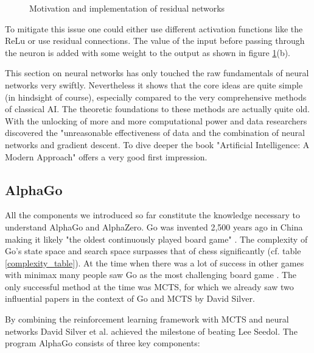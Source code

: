 \begin{figure}[!h]
    \centering
    \caption{Motivation and implementation of residual networks}
    \label{residual_network}
\end{figure}

To mitigate this issue one could either use different activation functions like the ReLu or use residual connections. The value of the input before passing through the neuron is added with some weight to the output as shown in figure \ref{residual_network}(b).

This section on neural networks has only touched the raw fundamentals of neural networks very swiftly. Nevertheless it shows that the core ideas are quite simple (in hindsight of course), especially compared to the very comprehensive methods of classical AI. The theoretic foundations to these methods are actually quite old. With the unlocking of more and more computational power and data researchers discovered the "unreasonable effectiveness of data \cite{halevy_unreasonable_2009} and the combination of neural networks and gradient descent. To dive deeper the book "Artificial Intelligence: A Modern Approach" \cite{russell_artificial_2021} offers a very good first impression.

\subsection{AlphaGo}
All the components we introduced so far constitute the knowledge necessary to understand AlphaGo and AlphaZero. Go was invented 2,500 years ago in China making it likely "the oldest continuously played board game" \cite{noauthor_go_2022}. The complexity of Go's state space and search space surpasses that of chess significantly (cf. table \ref{complexity_table}). At the time when there was a lot of success in other games with minimax many people saw Go as the most challenging board game \cite{muller_computer_2002}. The only successful method at the time was MCTS, for which we already saw two influential papers in the context of Go and MCTS by David Silver.

By combining the reinforcement learning framework with MCTS and neural networks David Silver et al. achieved the milestone of beating Lee Seedol. The program AlphaGo consists of three key components:

